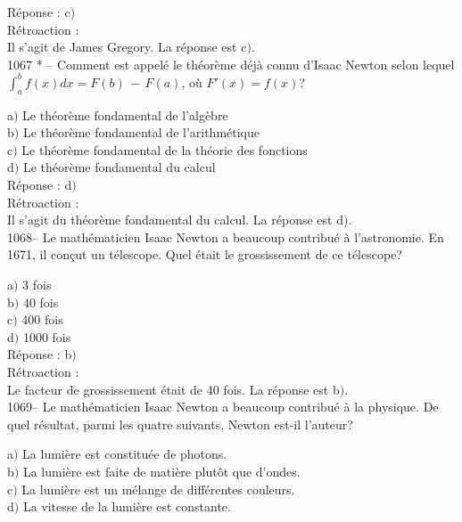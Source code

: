 ﻿\documentclass[letterpaper, 12pt]{article}
\begin{document}
R\'eponse : c$)$ \\

R\'etroaction : \\
Il s'agit de James Gregory.
La r\'eponse est c$)$.\\

1067 * -- Comment est appel\'e le th\'eor\`eme d\'ej\`a connu
d'Isaac Newton selon lequel $\int_a^bf(x)dx=F(b)\,-\,F(a)$, o\`u
$F'(x)=f(x)$?

a$)$ Le th\'eor\`eme fondamental de l'alg\`ebre \\
b$)$ Le th\'eor\`eme fondamental de l'arithm\'etique  \\
c$)$ Le th\'eor\`eme fondamental de la th\'eorie des fonctions  \\
d$)$ Le th\'eor\`eme fondamental du calcul\\

R\'eponse : d$)$ \\

R\'etroaction : \\
Il s'agit du th\'eor\`eme fondamental du calcul.
La r\'eponse est d$)$.\\

1068-- Le math\'ematicien Isaac Newton a beaucoup contribu\'e \`a
l'astronomie. En 1671, il con\c cut un t\'elescope. Quel \'etait le
grossissement de ce t\'elescope?

a$)$ 3 fois \\
b$)$ 40 fois  \\
c$)$ 400 fois  \\
d$)$ 1000 fois \\

R\'eponse : b$)$ \\

R\'etroaction : \\
Le facteur de grossissement \'etait de 40 fois.
La r\'eponse est b$)$.\\

1069-- Le math\'ematicien Isaac Newton a beaucoup contribu\'e \`a la
physique. De quel r\'esultat, parmi les quatre suivants, Newton
est-il l'auteur?

a$)$ La lumi\`ere est constitu\'ee de photons. \\
b$)$ La lumi\`ere est faite de mati\`ere plut\^ot que d'ondes.  \\
c$)$ La lumi\`ere est un \og m\'elange de diff\'erentes couleurs\fg .  \\
d$)$ La vitesse de la lumi\`ere est constante.\\
\end{document}
